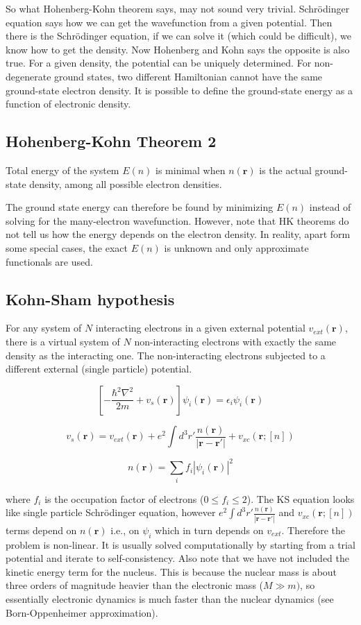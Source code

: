 \documentclass{article}
\begin{document}
So what Hohenberg-Kohn theorem says, may not sound very trivial. Schrödinger
equation says how we can get the wavefunction from a given potential. Then there
is the Schrödinger equation, if we can solve it (which could be difficult), we
know how to get the density. Now Hohenberg and Kohn says the opposite is also
true. For a given density, the potential can be uniquely determined. For
non-degenerate ground states, two different Hamiltonian cannot have the same
ground-state electron density. It is possible to define the ground-state energy
as a function of electronic density.\\

\subsection{Hohenberg-Kohn Theorem 2}
Total energy of the system $E(n)$ is minimal when $n(\textbf{r})$ is the
actual ground-state density, among all possible electron densities.

The ground state energy can therefore be found by minimizing $E(n)$ instead of
solving for the many-electron wavefunction. However, note that HK theorems do
not tell us how the energy depends on the electron density. In reality, apart
form some special cases, the exact $E(n)$ is unknown and only approximate
functionals are used.\\

\subsection{Kohn-Sham hypothesis}
 For any system of $N$ interacting electrons in a given external potential
$v_{ext} (\textbf{r})$, there is a virtual system of $N$ non-interacting
electrons with exactly the same density as the interacting one. The
non-interacting electrons subjected to a different external (single particle)
potential.

$$
\left[-\frac{\hbar^2 \nabla^2}{2m} + v_s(\textbf{r}) \right] \psi_i(\textbf{r})
= \epsilon_i \psi_i(\textbf{r})
$$

$$
v_s(\textbf{r}) = v_{ext}(\textbf{r}) + e^2 \int d^3r'
\frac{n(\textbf{r})}{|\textbf{r} - \textbf{r}'|} + v_{xc}(\textbf{r}; [n])
$$

$$
n(\textbf{r}) = \sum_i f_i |\psi_i (\textbf{r})|^2
$$

where $f_i$ is the occupation factor of electrons ($0 \le f_i \le 2$). The
KS equation looks like single particle Schrödinger equation, however $e^2 \int
d^3r' \frac{n(\textbf{r})}{|\textbf{r} - \textbf{r}'|}$ and $v_{xc} (\textbf{r};
[n])$ terms depend on $n(\textbf{r})$ i.e., on $\psi_i$ which in turn depends on
$v_{ext}$. Therefore the problem is non-linear. It is usually solved
computationally by starting from a trial potential and iterate to
self-consistency. Also note that we have not included the kinetic energy term
for the nucleus. This is because the nuclear mass is about three orders of
magnitude heavier than the electronic mass ($M \gg m)$, so essentially
electronic dynamics is much faster than the nuclear dynamics (see
Born-Oppenheimer approximation).\\
\end{document}

